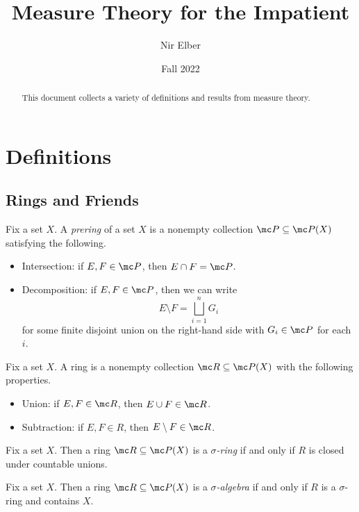 \documentclass{article}
\title{Measure Theory for the Impatient}
\author{Nir Elber}
\date{Fall 2022}
\begin{document}
\maketitle

\begin{abstract}
	This document collects a variety of definitions and results from measure theory.
\end{abstract}

\tableofcontents

\newpage

\section{Definitions}

\subsection{Rings and Friends}
\begin{definition}[Prering]
	Fix a set $X$. A \textit{prering} of a set $X$ is a nonempty collection $\mc P\subseteq\mc P(X)$ satisfying the following.
	\begin{itemize}
		\item Intersection: if $E,F\in\mc P$, then $E\cap F=\mc P$.
		\item Decomposition: if $E,F\in\mc P$, then we can write
		\[E\setminus F=\bigsqcup_{i=1}^nG_i\]
		for some finite disjoint union on the right-hand side with $G_i\in\mc P$ for each $i$.
	\end{itemize}
\end{definition}
\begin{definition}[Ring]
	Fix a set $X$. A ring is a nonempty collection $\mc R\subseteq\mc P(X)$ with the following properties.
	\begin{itemize}
		\item Union: if $E,F\in\mc R$, then $E\cup F\in\mc R$.
		\item Subtraction: if $E,F\in R$, then $E\setminus F\in\mc R$.
	\end{itemize}
\end{definition}
\begin{defihelper} 
	Fix a set $X$. Then a ring $\mc R\subseteq\mc P(X)$ is a \textit{$\sigma$-ring} if and only if $R$ is closed under countable unions.
\end{defihelper}
\begin{defihelper} 
	Fix a set $X$. Then a ring $\mc R\subseteq\mc P(X)$ is a \textit{$\sigma$-algebra} if and only if $R$ is a $\sigma$-ring and contains $X$.
\end{defihelper}
\end{document}
